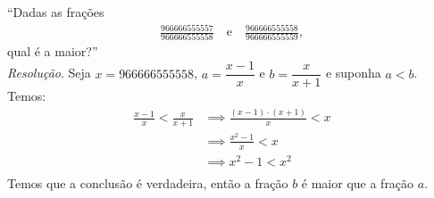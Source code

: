 \enquote{Dadas as frações
\begin{align*}
    \frac{966666555557}{966666555558} \quad \text{e} \quad
    \frac{966666555558}{966666555559},
\end{align*}
qual é a maior?}
\\
\emph{Resolução}. Seja $x = 966666555558$, $a = \dfrac{x-1}{x}$ e $b = \dfrac{x}{x+1}$ e suponha $a < b$. Temos:
\begin{align*}
    \frac{x - 1}{x} < \frac{x}{x + 1} & \implies 
    \frac{(x - 1) \cdot (x + 1)}{x} < x \\ & \implies
    \frac{x^2 - 1}{x} < x \\ & \implies
    x^2 - 1 < x^2 \\
\end{align*}
Temos que a conclusão é verdadeira, então a fração $b$ é maior que a fração $a$.